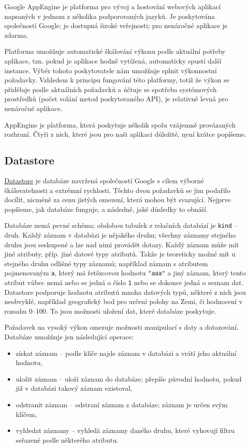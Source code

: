 Google AppEngine je platforma pro vývoj a hostování webových aplikací napsaných v jednom z několika podporovaných jazyků.
Je poskytována společností Google; je dostupná široké veřejnosti; pro nenáročné aplikace je zdarma.

Platforma umožňuje automatické škálování výkonu podle aktuální potřeby aplikace, tzn. pokud je aplikace hodně vytížená, automaticky spustí další instance.
Výběr tohoto poskytovatele nám umožňuje splnit výkonnostní požadavky.
Vzhledem k principu fungování této platformy, totiž že výkon se přiděluje podle aktuálních požadavků a účtuje se spotřeba systémových prostředků (počet volání metod poskytovaného API), je relativně levná pro nenáročné aplikace.

AppEngine je platforma, která poskytuje několik spolu vzájemně provázaných rozhraní.
Čtyři z nich, které jsou pro naši aplikaci důležité, nyní krátce popíšeme.

\subsection{Datastore}
\href{https://developers.google.com/appengine/docs/java/datastore/}{Datastore} je databáze navržená společností Google s cílem výborné škálovatelnosti a extrémní rychlosti.
Těchto dvou požadavků se jim podařilo docílit, nicméně za cenu jistých omezení, která mohou být svazující.
Nejprve popíšeme, jak databáze funguje, a následně, jaké důsledky to obnáší.

Databáze nemá pevné schéma; obdobou tabulek z relačních databází je \verb|kind| -- druh.
Každý záznam v databázi je nějakého druhu; všechny záznamy stejného druhu jsou seskupené a lze nad nimi provádět dotazy.
Každý záznam může mít jiné atributy, příp. jiné datové typy atributů.
Takže je teoreticky možné mít u stejného druhu odlišné typy záznamů; například záznam s atributem pojmenovaným \verb|a|, který má řetězcovou hodnotu \verb|"aaa"| a jiný záznam, který tento atribut vůbec nemá nebo se jedná o číslo \verb|1| nebo se dokonce jedná o seznam dat.
Datastore podporuje hodnotu atributů mnoha datových typů, některé z nich jsou neobvyklé, například geografický bod pro určení polohy na Zemi, či hodnocení v rozsahu \mbox{0--100}.
To jsou možnosti uložení dat, které databáze poskytuje.

Požadavek na vysoký výkon omezuje možnosti manipulací s daty a dotazování.
Databáze umožňuje jen následující operace:
\begin{itemize}
	\item získat záznam -- podle klíče najde záznam v databázi a vrátí jeho aktuální hodnotu,
	\item uložit záznam -- uloží záznam do databáze; přepíše původní hodnotu, pokud již v databázi takový záznam existoval,
	\item odstranit záznam -- odstraní záznam z databáze; záznam je určen svým klíčem,
	\item vyhledat záznamy -- vyhledá záznamy daného druhu, které vyhovují filtru seřazené podle některého atributu.
\end{itemize}

